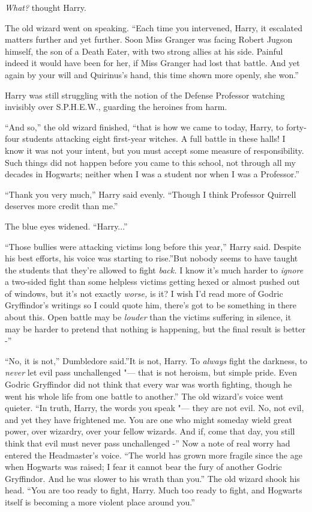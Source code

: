 \emph{What?} thought Harry.

The old wizard went on speaking. ``Each time you intervened, Harry, it
escalated matters further and yet further. Soon Miss Granger was facing
Robert Jugson himself, the son of a Death Eater, with two strong allies
at his side. Painful indeed it would have been for her, if Miss Granger
had lost that battle. And yet again by your will and Quirinus's hand,
this time shown more openly, she won.''

Harry was still struggling with the notion of the Defense Professor
watching invisibly over S.P.H.E.W., guarding the heroines from harm.

``And so,'' the old wizard finished, ``that is how we came to today,
Harry, to forty-four students attacking eight first-year witches. A full
battle in these halls! I know it was not your intent, but you must
accept some measure of responsibility. Such things did not happen before
you came to this school, not through all my decades in Hogwarts; neither
when I was a student nor when I was a Professor.''

``Thank you very much,'' Harry said evenly. ``Though I think Professor
Quirrell deserves more credit than me.''

The blue eyes widened. ``Harry...''

``Those bullies were attacking victims long before this year,'' Harry
said. Despite his best efforts, his voice was starting to rise.''But
nobody seems to have taught the students that they're allowed to fight
\emph{back.} I know it's much harder to \emph{ignore} a two-sided fight
than some helpless victims getting hexed or almost pushed out of
windows, but it's not exactly \emph{worse,} is it? I wish I'd read more
of Godric Gryffindor's writings so I could quote him, there's got to be
something in there about this. Open battle may be \emph{louder} than the
victims suffering in silence, it may be harder to pretend that nothing
is happening, but the final result is better -''

``No, it is not,'' Dumbledore said.''It is not, Harry. To \emph{always}
fight the darkness, to \emph{never} let evil pass unchallenged "--- that is
not heroism, but simple pride. Even Godric Gryffindor did not think that
every war was worth fighting, though he went his whole life from one
battle to another.'' The old wizard's voice went quieter. ``In truth,
Harry, the words you speak "--- they are not evil. No, not evil, and yet
they have frightened me. You are one who might someday wield great
power, over wizardry, over your fellow wizards. And if, come that day,
you still think that evil must never pass unchallenged -'' Now a note of
real worry had entered the Headmaster's voice. ``The world has grown
more fragile since the age when Hogwarts was raised; I fear it cannot
bear the fury of another Godric Gryffindor. And he was slower to his
wrath than you.'' The old wizard shook his head. ``You are too ready to
fight, Harry. Much too ready to fight, and Hogwarts itself is becoming a
more violent place around you.''

